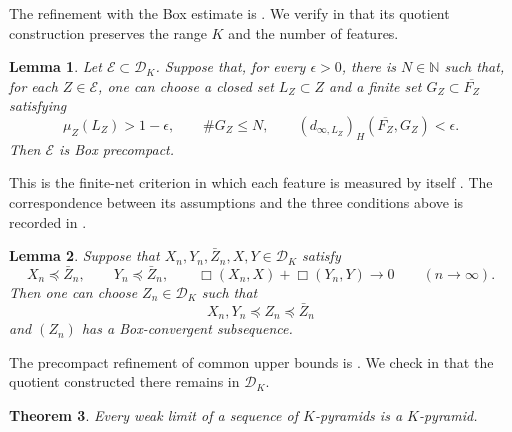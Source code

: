 \documentclass[11pt]{amsart}
\theoremstyle{plain}
\newtheorem{theorem}{Theorem}[section]
\newtheorem{lemma}[theorem]{Lemma}
\theoremstyle{definition}
\theoremstyle{remark}
\newcommand{\DK}{\mathcal D_K}
\begin{document}
The refinement with the Box estimate is \cite[Lemma~5.4]{gds2}. We verify in  that its quotient construction preserves the range $K$ and the number of features.

\begin{lemma}
\label{lem:finite-net-precompactness}
Let $\mathcal E\subset\DK$. Suppose that, for every $\epsilon>0$, there is $N\in\mathbb N$ such that, for each $Z\in\mathcal E$, one can choose a closed set $L_Z\subset Z$ and a finite set $G_Z\subset\overline{F_Z}$ satisfying
\[
\mu_Z(L_Z)>1-\epsilon,\qquad\#G_Z\leq N,\qquad(d_{\infty,L_Z})_H(\overline{F_Z},G_Z)<\epsilon.
\]
Then $\mathcal E$ is Box precompact.
\end{lemma}

This is the finite-net criterion in which each feature is measured by itself \cite[Lemma~4.12]{gds2}. The correspondence between its assumptions and the three conditions above is recorded in .

\begin{lemma}
\label{lem:K-common-upper-bound}
Suppose that $X_n,Y_n,\bar Z_n,X,Y\in\DK$ satisfy
\[
X_n\preceq\bar Z_n,\qquad Y_n\preceq\bar Z_n,\qquad\Box(X_n,X)+\Box(Y_n,Y)\longrightarrow0\qquad(n\to\infty).
\]
Then one can choose $Z_n\in\DK$ such that
\[
X_n,Y_n\preceq Z_n\preceq\bar Z_n
\]
and $(Z_n)$ has a Box-convergent subsequence.
\end{lemma}

The precompact refinement of common upper bounds is \cite[Lemma~5.6]{gds2}. We check in  that the quotient constructed there remains in $\DK$.

\begin{theorem}
\label{thm:K-pyramid-weak-limit}
Every weak limit of a sequence of $K$-pyramids is a $K$-pyramid.
\end{theorem}
\end{document}
